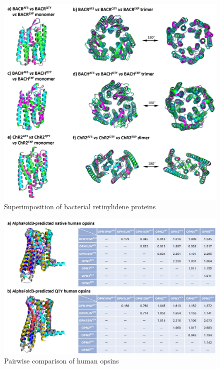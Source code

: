 \documentclass[fleqn,10pt,lineno]{manuscript}
\begin{document}
\begin{figure}[h]
	\centering
	\includegraphics[width=\linewidth]{Figures/superimposition-bacterial.jpg}
	\caption{Superimposition of bacterial retinylidene proteins}
	\label{fig:bacterialsup}
\end{figure}

\begin{figure}[h]
	\centering
	\includegraphics[width=\linewidth]{Figures/pairwise.jpg}
	\caption{Pairwise comparison of human opsins}
	\label{fig:pairwise}
\end{figure}
\end{document}
